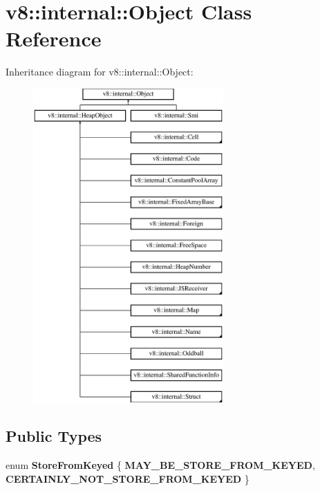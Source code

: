 \hypertarget{classv8_1_1internal_1_1_object}{}\section{v8\+:\+:internal\+:\+:Object Class Reference}
\label{classv8_1_1internal_1_1_object}
Inheritance diagram for v8\+:\+:internal\+:\+:Object\+:\begin{figure}[H]
\begin{center}
\leavevmode
\includegraphics[height=12.000000cm]{classv8_1_1internal_1_1_object}
\end{center}
\end{figure}
\subsection*{Public Types}
\begin{DoxyCompactItemize}
\item 
\hypertarget{classv8_1_1internal_1_1_object_a49bfc483fe7dd232e030ef1b7bba66b4}{}enum {\bfseries Store\+From\+Keyed} \{ {\bfseries M\+A\+Y\+\_\+\+B\+E\+\_\+\+S\+T\+O\+R\+E\+\_\+\+F\+R\+O\+M\+\_\+\+K\+E\+Y\+E\+D}, 
{\bfseries C\+E\+R\+T\+A\+I\+N\+L\+Y\+\_\+\+N\+O\+T\+\_\+\+S\+T\+O\+R\+E\+\_\+\+F\+R\+O\+M\+\_\+\+K\+E\+Y\+E\+D}
 \}\label{classv8_1_1internal_1_1_object_a49bfc483fe7dd232e030ef1b7bba66b4}

\end{DoxyCompactItemize}
